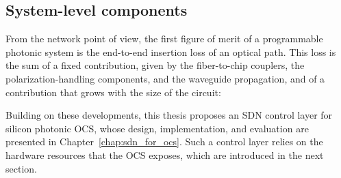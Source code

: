 %

\subsection{System-level components}\label{sub:system_component}
From the network point of view, the first figure of merit of a programmable photonic system is the end-to-end insertion loss of an optical path.
This loss is the sum of a fixed contribution, given by the fiber-to-chip couplers, the polarization-handling components, and the waveguide propagation, and of a contribution that grows with the size of the circuit:


%

Building on these developments, this thesis proposes an SDN control layer for silicon photonic OCS, whose design, implementation, and evaluation are presented in Chapter~\ref{chap:sdn_for_ocs}.
Such a control layer relies on the hardware resources that the OCS exposes, which are introduced in the next section.


%
%

